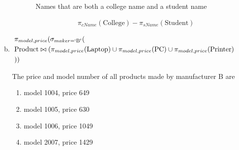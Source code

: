 \documentclass[12pt]{article}
\begin{document}
\begin{enumerate}
\begin{enumerate}[a)]
\begin{itemize}
\begin{itemize}
                \bigskip

                Names that are both a college name and a student name

                \bigskip

                \begin{align*}
                    \pi_{cName} (\text{College}) - \pi_{sName}(\text{Student})
                \end{align*}
            \end{itemize}
        \end{itemize}

        \item

        \begin{align}
            \begin{split}
            &\pi_{model,price}(\sigma_{maker=`\text{B}'}(\\
            &\text{Product} \bowtie (\pi_{model,price}(\text{Laptop}) \cup \pi_{model,price}(\text{PC}) \cup \pi_{model,price}(\text{Printer})\\
            &))
            \end{split}
        \end{align}

        \bigskip

        The price and model number of all products made by manufacturer B are


        \begin{enumerate}[1.]
            \item model 1004, price 649
            \item model 1005, price 630
            \item model 1006, price 1049
            \item model 2007, price 1429
        \end{enumerate}


\end{enumerate}
\end{enumerate}
\end{document}
